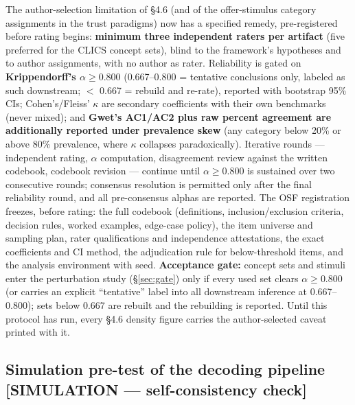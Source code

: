 \documentclass[11pt,twocolumn]{article}
\theoremstyle{plain}
\begin{document}
The author-selection limitation of \S{}4.6 (and of the offer-stimulus category assignments in the trust paradigms) now has a specified remedy, pre-registered before rating begins: \textbf{minimum three independent raters per artifact} (five preferred for the CLICS concept sets), blind to the framework's hypotheses and to author assignments, with no author as rater. Reliability is gated on \textbf{Krippendorff's \(\alpha \geq 0.800\)} \citep{krippendorff2011} (0.667--0.800 = tentative conclusions only, labeled as such downstream; \(<\) 0.667 = rebuild and re-rate), reported with bootstrap 95\% CIs; Cohen's/Fleiss' \(\kappa\) are secondary coefficients with their own benchmarks (never mixed); and \textbf{Gwet's AC1/AC2 \citep{gwet2008} plus raw percent agreement are additionally reported under prevalence skew} (any category below 20\% or above 80\% prevalence, where \(\kappa\) collapses paradoxically). Iterative rounds --- independent rating, \(\alpha\) computation, disagreement review against the written codebook, codebook revision --- continue until \(\alpha \geq 0.800\) is sustained over two consecutive rounds; consensus resolution is permitted only after the final reliability round, and all pre-consensus alphas are reported. The OSF registration freezes, before rating: the full codebook (definitions, inclusion/exclusion criteria, decision rules, worked examples, edge-case policy), the item universe and sampling plan, rater qualifications and independence attestations, the exact coefficients and CI method, the adjudication rule for below-threshold items, and the analysis environment with seed. \textbf{Acceptance gate:} concept sets and stimuli enter the perturbation study (\S\ref{sec:gate}) only if every used set clears \(\alpha \geq 0.800\) (or carries an explicit ``tentative'' label into all downstream inference at 0.667--0.800); sets below 0.667 are rebuilt and the rebuilding is reported. Until this protocol has run, every \S{}4.6 density figure carries the author-selected caveat printed with it.

\subsection{Simulation pre-test of the decoding pipeline [SIMULATION — self-consistency check]}
\end{document}
